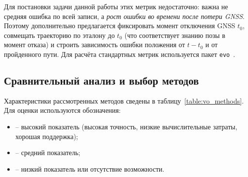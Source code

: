     Для постановки задачи данной работы этих метрик недостаточно: важна не средняя ошибка по всей записи, а \emph{рост ошибки во времени после потери GNSS}.
    Поэтому дополнительно предлагается фиксировать момент отключения GNSS $t_0$, совмещать траекторию по эталону до $t_0$ (что соответствует знанию позы в момент отказа) и строить зависимость ошибки положения от $t - t_0$ и от пройденного пути.
    Для расчёта стандартных метрик используется пакет \texttt{evo}~\cite{evo}.

    \subsection{Сравнительный анализ и выбор методов}

    Характеристики рассмотренных методов сведены в таблицу~\ref{table:vo_methods}.
    Для оценки используются обозначения:
    \begin{itemize}
        \item[«$+$»] -- высокий показатель (высокая точность, низкие вычислительные затраты, хорошая поддержка);
        \item[«$+-$»] -- средний показатель;
        \item[«$-$»] -- низкий показатель или отсутствие возможности.
    \end{itemize}

